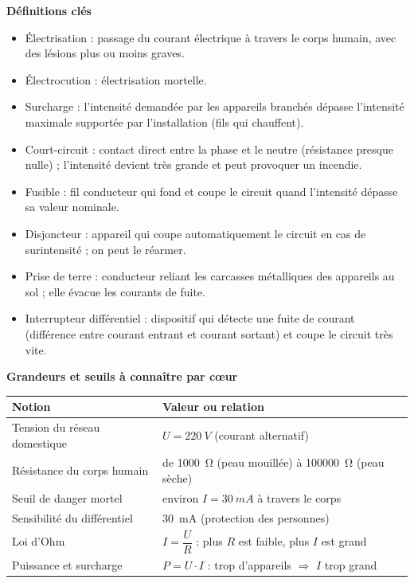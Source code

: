 \documentclass[11pt]{article}
\newcommand{\cle}[1]{{\popxbold\color{popdark}#1}}
\begin{document}
\begin{bilan}
\textbf{Définitions clés}
\begin{itemize}
  \item \cle{Électrisation} : passage du courant électrique à travers le corps humain, avec des lésions plus ou moins graves.
  \item \cle{Électrocution} : électrisation mortelle.
  \item \cle{Surcharge} : l'intensité demandée par les appareils branchés dépasse l'intensité maximale supportée par l'installation (fils qui chauffent).
  \item \cle{Court-circuit} : contact direct entre la phase et le neutre (résistance presque nulle) ; l'intensité devient très grande et peut provoquer un incendie.
  \item \cle{Fusible} : fil conducteur qui fond et coupe le circuit quand l'intensité dépasse sa valeur nominale.
  \item \cle{Disjoncteur} : appareil qui coupe automatiquement le circuit en cas de surintensité ; on peut le réarmer.
  \item \cle{Prise de terre} : conducteur reliant les carcasses métalliques des appareils au sol ; elle évacue les courants de fuite.
  \item \cle{Interrupteur différentiel} : dispositif qui détecte une fuite de courant (différence entre courant entrant et courant sortant) et coupe le circuit très vite.
\end{itemize}

\textbf{Grandeurs et seuils à connaître par cœur}
\begin{center}
\begin{tabularx}{\linewidth}{|l|X|}\hline
\rowcolor{popblueL} \textbf{Notion} & \textbf{Valeur ou relation} \\ \hline
Tension du réseau domestique & $U = \SI{220}{V}$ (courant alternatif) \\ \hline
Résistance du corps humain & de \SI{1000}{\ohm} (peau mouillée) à \SI{100000}{\ohm} (peau sèche) \\ \hline
Seuil de danger mortel & environ $I = \SI{30}{mA}$ à travers le corps \\ \hline
Sensibilité du différentiel & \SI{30}{mA} (protection des personnes) \\ \hline
Loi d'Ohm & $I = \dfrac{U}{R}$ : plus $R$ est faible, plus $I$ est grand \\ \hline
Puissance et surcharge & $P = U \cdot I$ : trop d'appareils $\Rightarrow$ $I$ trop grand \\ \hline
\end{tabularx}
\end{center}


\end{bilan}
\end{document}
